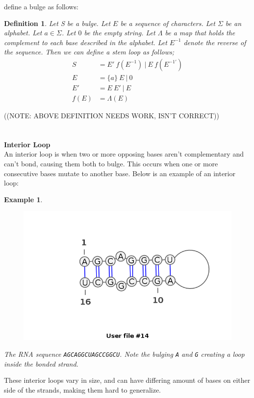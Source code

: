 \documentclass{article}
\newtheorem{myex}{Example}
\newtheorem{mydef}{Definition}
\begin{document}
define a bulge as follows:
\begin{mydef}\centering
Let S be a bulge. Let $E$ be a sequence of characters. Let $\Sigma$ be an alphabet. 
Let $a \in \Sigma$. Let $0$ be the empty string. Let $\Lambda$ be a map that holds the complement to each 
base described in the alphabet. Let $E^{-1}$ denote the reverse of the sequence. 
Then we can define a stem loop as follows;
\begin{align*}
S    &= E'~f(E^{-1})~|~E~f(E^{-1\prime})\\
E    &= \{a\}~E~|~0\\
E'   &= E~E'~|~E\\
f(E) &= \Lambda(E)
\end{align*}
\end{mydef}
((NOTE: ABOVE DEFINITION NEEDS WORK, ISN'T CORRECT))\\
\\\\
\textbf{Interior Loop}\\
An interior loop is when two or more opposing bases aren't complementary and 
can't bond, causing them both to bulge. This occurs when one or more 
consecutive bases mutate to another base. Below is an example of an interior 
loop:
\begin{myex}\centering
\begin{figure}[h]
\includegraphics[scale=0.5]{./lib/interior-loop.png}
\end{figure}
The RNA sequence {\tt AGCAGGCUAGCCGGCU}. Note the bulging {\tt A} and {\tt G} 
creating a loop inside the bonded strand.
\end{myex}
These interior loops vary in size, and can have differing amount of bases on 
either side of the strands, making them hard to generalize.\\
\end{document}
